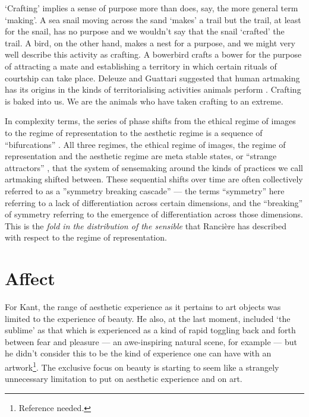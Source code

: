 \documentclass[letterpaper]{article}
\begin{document}
    ‘Crafting’ implies a sense of purpose more than does, say, the more general term ‘making’. A sea snail moving across the sand ‘makes’ a trail but the trail, at least for the snail, has no purpose and we wouldn't say that the snail ‘crafted’ the trail. A bird, on the other hand, makes a nest for a purpose, and we might very well describe this activity as crafting. A bowerbird crafts a bower for the purpose of attracting a mate and establishing a territory in which certain rituals of courtship can take place. Deleuze and Guattari suggested that human artmaking has its origins in the kinds of territorialising activities animals perform \citep[p.15]{GuattariChsmss1995}. Crafting is baked into us. We are the animals who have taken crafting to an extreme.
    
    In complexity terms, the series of phase shifts from the ethical regime of images to the regime of representation to the aesthetic regime is a sequence of “bifurcations” \citep{LandauThryOfPhstrnstns1936}. All three regimes, the ethical regime of images, the regime of representation and the aesthetic regime are meta stable states, or “strange attractors” \citep{RuelleTakensOnThNtrOfTrblnc1971}, that the system of sensemaking around the kinds of practices we call artmaking shifted between. These sequential shifts over time are often collectively referred to as a ”symmetry breaking cascade” — the terms “symmetry” here referring to a lack of differentiation across certain dimensions, and the “breaking” of symmetry referring to the emergence of differentiation across those dimensions. This is the \emph{fold in the distribution of the sensible} that Rancière has described with respect to the regime of representation.

\section{Affect}

    For Kant, the range of aesthetic experience as it pertains to art objects was limited to the experience of beauty.  He also, at the last moment, included ‘the sublime’ \citep[p.15]{ZepkeSblmArt2017} as that which is experienced as a kind of rapid toggling back and forth between fear and pleasure — an awe-inspiring natural scene, for example — but he didn't consider this to be the kind of experience one can have with an artwork\footnote{Reference needed.}. The exclusive focus on beauty is starting to seem like a strangely unnecessary limitation to put on aesthetic experience and on art. 
        
\end{document}

